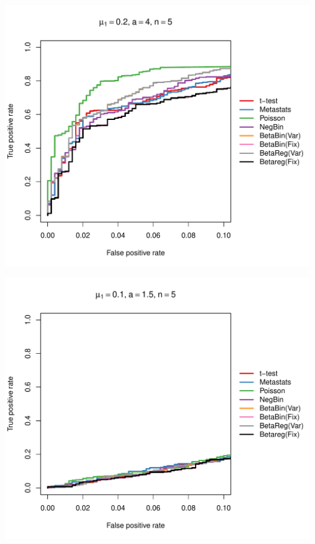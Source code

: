 \documentclass[12pt]{article}\usepackage{graphicx, color}
\makeatletter
\def\maxwidth{ %
  \ifdim\Gin@nat@width>\linewidth
    \linewidth
  \else
    \Gin@nat@width
  \fi
}
\newenvironment{knitrout}{}{} %
\makeatother
\begin{document}
\begin{knitrout}
{\centering \includegraphics[width=\maxwidth]{figure/rocs39} 

}




{\centering \includegraphics[width=\maxwidth]{figure/rocs40} 

}





\end{knitrout}
\end{document}
